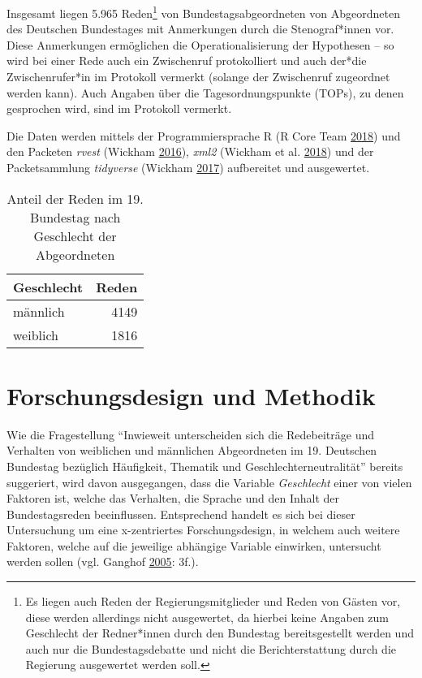 \documentclass[12pt,ngerman,]{article}
\begin{document}
Insgesamt liegen 5.965 Reden\footnote{Es liegen auch Reden der
  Regierungsmitglieder und Reden von Gästen vor, diese werden allerdings
  nicht ausgewertet, da hierbei keine Angaben zum Geschlecht der
  Redner*innen durch den Bundestag bereitsgestellt werden und auch nur
  die Bundestagsdebatte und nicht die Berichterstattung durch die
  Regierung ausgewertet werden soll.} von Bundestagsabgeordneten von
Abgeordneten des Deutschen Bundestages mit Anmerkungen durch die
Stenograf*innen vor. Diese Anmerkungen ermöglichen die
Operationalisierung der Hypothesen -- so wird bei einer Rede auch ein
Zwischenruf protokolliert und auch der*die Zwischenrufer*in im Protokoll
vermerkt (solange der Zwischenruf zugeordnet werden kann). Auch Angaben
über die Tagesordnungspunkte (TOPs), zu denen gesprochen wird, sind im
Protokoll vermerkt.

Die Daten werden mittels der Programmiersprache R (R Core Team
\protect\hyperlink{ref-rcoreteam_2018}{2018}) und den Packeten
\emph{rvest} (Wickham \protect\hyperlink{ref-wickham_2016}{2016}),
\emph{xml2} (Wickham et al. \protect\hyperlink{ref-wickham_2018}{2018})
und der Packetsammlung \emph{tidyverse} (Wickham
\protect\hyperlink{ref-wickham_2017}{2017}) aufbereitet und ausgewertet.

\begin{table}[!h]

\caption{\label{tab:unnamed-chunk-1}Anteil der Reden im 19. Bundestag nach Geschlecht der Abgeordneten}
\centering
\begin{tabular}{lr}
\toprule
Geschlecht & Reden\\
\midrule
männlich & 4149\\
weiblich & 1816\\
\bottomrule
\end{tabular}
\end{table}

\hypertarget{forschungsdesign-und-methodik}{%
\section{Forschungsdesign und
Methodik}\label{forschungsdesign-und-methodik}}

Wie die Fragestellung \enquote{Inwieweit unterscheiden sich die
Redebeiträge und Verhalten von weiblichen und männlichen Abgeordneten im
19. Deutschen Bundestag bezüglich Häufigkeit, Thematik und
Geschlechterneutralität} bereits suggeriert, wird davon ausgegangen,
dass die Variable \emph{Geschlecht} einer von vielen Faktoren ist,
welche das Verhalten, die Sprache und den Inhalt der Bundestagsreden
beeinflussen. Entsprechend handelt es sich bei dieser Untersuchung um
eine x-zentriertes Forschungsdesign, in welchem auch weitere Faktoren,
welche auf die jeweilige abhängige Variable einwirken, untersucht werden
sollen (vgl. Ganghof \protect\hyperlink{ref-ganghof_2005}{2005}: 3f.).
\end{document}
